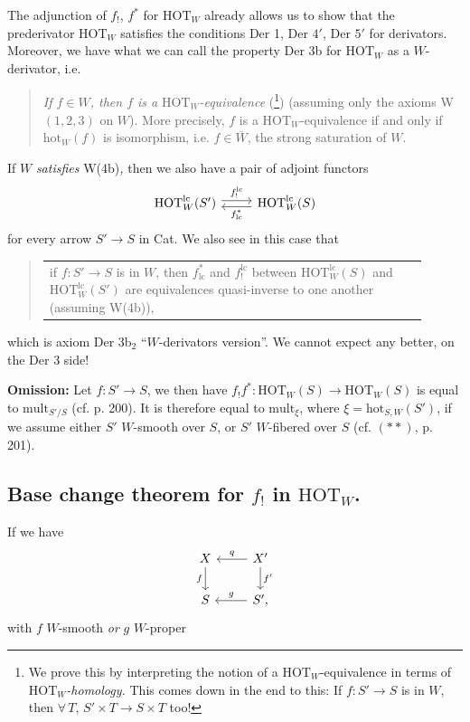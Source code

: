 The adjunction of $f_!$, $f^*$ for $\mathrm{HOT}_W$ already allows us to show that the prederivator $\mathrm{HOT}_W$
satisfies the conditions Der 1, Der $4'$, Der $5'$ for derivators. Moreover, we have what we can call the property Der 3b for $\mathrm{HOT}_W$ as a $W$-derivator, i.e.

\begin{quote}
\textit{If $f\in W$, then $f$ is a} $\mathrm{HOT}_W$\textit{-equivalence} (\footnote{We prove this by interpreting the notion of a $\mathrm{HOT}_W$-equivalence in terms of $\mathrm{HOT}_W$\textit{-homology.} This comes down in the end to this: If $f : S' \longrightarrow S$ is in $W$, then $\forall\, T$, $S'\times T \longrightarrow S\times T$ too!}) (assuming only the axioms W$(1,2,3)$ on $W$). More precisely, $f$ is a $\mathrm{HOT}_W$-equivalence if and only if $\mathrm{hot}_W(f)$ is isomorphism, i.e. $f\in \overline{W}$, the strong saturation of $W$.
\end{quote}

If $W$ \textit{satisfies} W(4b)\textit{,} then we also have a pair of adjoint functors
\[
\begin{tikzcd}
\mathrm{HOT}_W^{\mathrm{lc}}(S') \arrow[r, shift left, "f_!^{\mathrm{lc}}"] & \mathrm{HOT}_W^{\mathrm{lc}}(S) \arrow[l, shift left, "f^*_{\mathrm{lc}}"]
\end{tikzcd}
\]
for every arrow $S'\longrightarrow S$ in Cat. We also see in this case that %

\begin{quote}
\begin{tabular}{|p{0.9\linewidth}}
if $f : S' \longrightarrow S$ is in $W$, then $f^*_{\mathrm{lc}}$ and $f_!^{\mathrm{lc}}$ between $\mathrm{HOT}_W^{\mathrm{lc}}(S)$ and $\mathrm{HOT}_W^{\mathrm{lc}}(S')$ are equivalences quasi-inverse to one another (assuming W(4b)),
\end{tabular}
\end{quote}

which is axiom Der 3b$_2$ ``$W$-derivators version''. We cannot expect any better, on the Der 3 side!

\textbf{Omission:} Let $f : S' \longrightarrow S$, we then have $\boxed{f_!f^*} : \mathrm{HOT}_W(S) \longrightarrow \mathrm{HOT}_W(S)$ is equal to $\mathrm{mult}_{S'/S}$ (cf. p. 200). It is therefore equal to $\mathrm{mult}_\xi$, where $\xi = \mathrm{hot}_{S,W}(S')$, if we assume either $S'$ $W$-smooth over $S$, or $S'$ $W$-fibered over $S$ (cf. $(**)$, p. 201).

\subsection*{\protect{} Base change theorem for $f_!$ in $\mathrm{HOT}_W$.}

If we have
\[
\begin{tikzcd}
X \arrow[d, "f"'] & X' \arrow[l, "q"'] \arrow[d, "f'"] \\
S & S', \arrow[l, "g"']
\end{tikzcd}
\]
with $f$ $W$-smooth \textit{or} $g$ $W$-proper